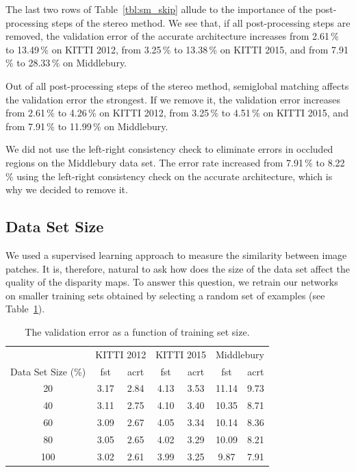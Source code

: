 \documentclass[twoside,11pt]{article}
\begin{document}
The last two rows of Table~\ref{tbl:sm_skip} allude to the importance of the
post-processing steps of the stereo method. We see that, if all post-processing
steps are removed, the validation error of the accurate architecture increases
from 2.61\,\% to 13.49\,\% on KITTI 2012, from 3.25\,\% to 13.38\,\% on KITTI
2015, and from 7.91\,\% to 28.33\,\% on Middlebury. 

Out of all post-processing steps of the stereo method, semiglobal matching
affects the validation error the strongest. If we remove it, the validation
error increases from 2.61\,\% to 4.26\,\% on KITTI 2012, from 3.25\,\% to
4.51\,\% on KITTI 2015, and from 7.91\,\% to 11.99\,\% on Middlebury. 

We did not use the left-right consistency check to eliminate errors in occluded
regions on the Middlebury data set.  The error rate increased from 7.91\,\% to
8.22\,\% using the left-right consistency check on the accurate architecture,
which is why we decided to remove it.

\subsection{Data Set Size}

We used a supervised learning approach to measure the similarity between
image patches. It is, therefore, natural to ask how does the size of the data
set affect the quality of the disparity maps. To answer this question, we
retrain our networks on smaller training sets obtained by selecting a random
set of examples (see Table~\ref{tbl:dataset_size}).

\begin{table}[tb]
\begin{center}
\begin{tabular}{c ccc ccc}
\toprule
& \multicolumn{2}{c}{KITTI 2012} & \multicolumn{2}{c}{KITTI 2015} & \multicolumn{2}{c}{Middlebury} \\
\cmidrule(lr){2-3}
\cmidrule(lr){4-5}
\cmidrule(lr){6-7}
Data Set Size (\%) & fst & acrt & fst & acrt & fst & acrt\\\midrule
20 & 3.17 & 2.84 & 4.13 & 3.53 & 11.14 & 9.73 \\
40 & 3.11 & 2.75 & 4.10 & 3.40 & 10.35 & 8.71 \\
60 & 3.09 & 2.67 & 4.05 & 3.34 & 10.14 & 8.36 \\
80 & 3.05 & 2.65 & 4.02 & 3.29 & 10.09 & 8.21 \\
100 & 3.02 & 2.61 & 3.99 & 3.25 & 9.87 & 7.91 \\
\bottomrule
\end{tabular}
\caption{The validation error as a function of training set size.}

\label{tbl:dataset_size}
\end{center}
\end{table}
\end{document}
